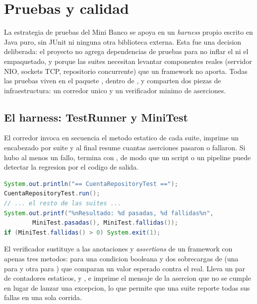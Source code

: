 \section{Pruebas y calidad}

La estrategia de pruebas del Mini Banco se apoya en un \emph{harness} propio
escrito en Java puro, sin JUnit ni ninguna otra biblioteca externa. Esta fue una
decision deliberada: el proyecto no agrega dependencias de pruebas para no
inflar el  ni el empaquetado, y porque las suites necesitan
levantar componentes reales (servidor NIO, sockets TCP, repositorio
concurrente) que un framework no aporta. Todas las pruebas viven en el paquete
, dentro de , y comparten dos
piezas de infraestructura: un corredor unico y un verificador minimo de
aserciones.

\subsection{El harness: TestRunner y MiniTest}

El corredor  invoca en secuencia el metodo
estatico  de cada suite, imprime un encabezado por suite y al
final resume cuantas aserciones pasaron o fallaron. Si hubo al menos un fallo,
termina con , de modo que un script o un pipeline puede
detectar la regresion por el codigo de salida.

\begin{lstlisting}[language=Java,caption={TestRunner orquesta las suites y propaga el fallo via codigo de salida}]
System.out.println("== CuentaRepositoryTest ==");
CuentaRepositoryTest.run();
// ... el resto de las suites ...
System.out.printf("%nResultado: %d pasadas, %d fallidas%n",
        MiniTest.pasadas(), MiniTest.fallidas());
if (MiniTest.fallidas() > 0) System.exit(1);
\end{lstlisting}

El verificador  sustituye a las anotaciones y
\emph{assertions} de un framework con apenas tres metodos:  para
una condicion booleana y dos sobrecargas de  (una para
 y otra para ) que comparan un valor esperado contra
el real. Lleva un par de contadores estaticos,  y
, e imprime el mensaje de la asercion que no se cumple en lugar
de lanzar una excepcion, lo que permite que una suite reporte todas sus fallas
en una sola corrida.

